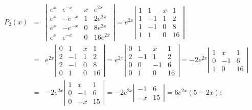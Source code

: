 \documentclass[dvips]{book}
\numberwithin{example}{section}
\numberwithin{equation}{section}
\numberwithin{theorem}{section}
\numberwithin{table}{section}
\numberwithin{figure}{section}
\begin{document}
\begin{eqnarray*}
P_2(x)&=&
\left|\begin{array}{crcc}
e^x&e^{-x}&x&e^{2x}\\
e^x&-e^{-x}&1&2e^{2x}\\
e^x&-e^{-x}&0&8e^{2x}\\
e^x&e^{-x}&0&16e^{2x}
\end{array}\right|=
e^{2x}\left|\begin{array}{crcc}
1&1&x&1\\
1&-1&1&2\\
1&-1&0&8\\
1&1&0&16
\end{array}\right|\\
&=&e^{2x}\left|\begin{array}{crcc}
0&1&x&1\\
2&-1&1&2\\
2&-1&0&8\\
0&1&0&16
\end{array}\right|
=e^{2x}\left|\begin{array}{crrc}
0&1&x&1\\
2&-1&1&2\\
0&0&-1&6\\
0&1&0&16
\end{array}\right|
=-2e^{2x}\left|\begin{array}{crrc}
1&x&1\\
0&-1&6\\
1&0&16
\end{array}\right|\\
&=&-2e^{2x}\left|\begin{array}{crrc}
1&x&1\\
0&-1&6\\
0&-x&15
\end{array}\right|
=-2e^{2x}\left|\begin{array}{crrc}
-1&6\\
-x&15
\end{array}\right|=6e^{2x}(5-2x);
\end{eqnarray*}
\end{document}
